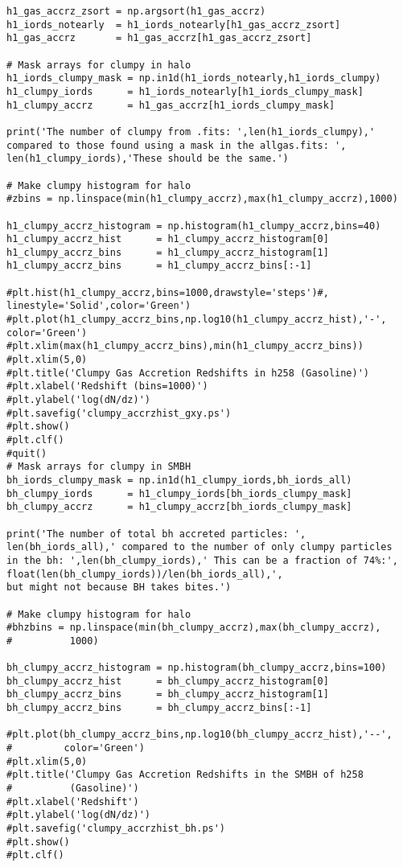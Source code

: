 \documentclass[12pt,headA,chapB]{fiskthesis}
\begin{document}
\begin{verbatim}
h1_gas_accrz_zsort = np.argsort(h1_gas_accrz)
h1_iords_notearly  = h1_iords_notearly[h1_gas_accrz_zsort]
h1_gas_accrz       = h1_gas_accrz[h1_gas_accrz_zsort]

# Mask arrays for clumpy in halo
h1_iords_clumpy_mask = np.in1d(h1_iords_notearly,h1_iords_clumpy)
h1_clumpy_iords      = h1_iords_notearly[h1_iords_clumpy_mask]
h1_clumpy_accrz      = h1_gas_accrz[h1_iords_clumpy_mask]

print('The number of clumpy from .fits: ',len(h1_iords_clumpy),' 
compared to those found using a mask in the allgas.fits: ',
len(h1_clumpy_iords),'These should be the same.')

# Make clumpy histogram for halo
#zbins = np.linspace(min(h1_clumpy_accrz),max(h1_clumpy_accrz),1000)

h1_clumpy_accrz_histogram = np.histogram(h1_clumpy_accrz,bins=40)
h1_clumpy_accrz_hist      = h1_clumpy_accrz_histogram[0]
h1_clumpy_accrz_bins      = h1_clumpy_accrz_histogram[1]
h1_clumpy_accrz_bins      = h1_clumpy_accrz_bins[:-1]

#plt.hist(h1_clumpy_accrz,bins=1000,drawstyle='steps')#,
linestyle='Solid',color='Green')
#plt.plot(h1_clumpy_accrz_bins,np.log10(h1_clumpy_accrz_hist),'-',
color='Green')
#plt.xlim(max(h1_clumpy_accrz_bins),min(h1_clumpy_accrz_bins))
#plt.xlim(5,0)
#plt.title('Clumpy Gas Accretion Redshifts in h258 (Gasoline)')
#plt.xlabel('Redshift (bins=1000)')
#plt.ylabel('log(dN/dz)')
#plt.savefig('clumpy_accrzhist_gxy.ps')
#plt.show()
#plt.clf()
#quit()
# Mask arrays for clumpy in SMBH
bh_iords_clumpy_mask = np.in1d(h1_clumpy_iords,bh_iords_all)
bh_clumpy_iords      = h1_clumpy_iords[bh_iords_clumpy_mask]
bh_clumpy_accrz      = h1_clumpy_accrz[bh_iords_clumpy_mask]

print('The number of total bh accreted particles: ',
len(bh_iords_all),' compared to the number of only clumpy particles 
in the bh: ',len(bh_clumpy_iords),' This can be a fraction of 74%:',
float(len(bh_clumpy_iords))/len(bh_iords_all),', 
but might not because BH takes bites.')

# Make clumpy histogram for halo
#bhzbins = np.linspace(min(bh_clumpy_accrz),max(bh_clumpy_accrz),
#          1000)

bh_clumpy_accrz_histogram = np.histogram(bh_clumpy_accrz,bins=100)
bh_clumpy_accrz_hist      = bh_clumpy_accrz_histogram[0]
bh_clumpy_accrz_bins      = bh_clumpy_accrz_histogram[1]
bh_clumpy_accrz_bins      = bh_clumpy_accrz_bins[:-1]

#plt.plot(bh_clumpy_accrz_bins,np.log10(bh_clumpy_accrz_hist),'--',
#         color='Green')
#plt.xlim(5,0)
#plt.title('Clumpy Gas Accretion Redshifts in the SMBH of h258 
#          (Gasoline)')
#plt.xlabel('Redshift')
#plt.ylabel('log(dN/dz)')
#plt.savefig('clumpy_accrzhist_bh.ps')
#plt.show()
#plt.clf()


\end{verbatim}
\end{document}

